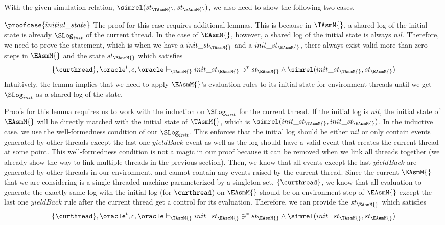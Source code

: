 With the given simulation relation, $\simrel(st_{\TAsmM{}}, st_{\EAsmM{}})$, we also need to show the following two cases.

$\proofcase{initial\_state}$ 
The proof for this case requires additional lemmas.
This is because in $\TAsmM{}$, a shared log of the initial state is already $\SLog_{init}$ of the current thread.
In the case of $\EAsmM{}$, however, a shared log of the initial state is always $nil$. 
Therefore, we need to prove the statement, which is when we have a $init\_st_\TAsmM{}$ and a $init\_st_\EAsmM{}$, there always exist valid more than zero steps in $\EAsmM{}$ and the state $st_{\EAsmM{}}$ which satisfies
$$ \{\curthread\}, \oracle^{t}, c, \oracle\vdash_{\TAsmM{}} init\_st_{\EAsmM{}} \ni^{*} st_{\EAsmM{}} \wedge \simrel(init\_st_{\TAsmM{}}, st_{\EAsmM{}})$$
Intuitively, the lemma implies that we need to apply $\EAsmM{}$'s evaluation rules to its initial state for environment threads until we get $\SLog_{init}$ as a shared log of the state.

Proofs for this lemma requires us to work with the induction on $\SLog_{init}$ for the current thread.
If the initial log is $nil$, the initial state of $\EAsmM{}$ will be directly matched with the initial state of $\TAsmM{}$, which is $\simrel(init\_st_{\TAsmM{}}, init\_st_{\EAsmM{}})$.
In the inductive case, we use the well-formedness condition of our $\SLog_{init}$. 
This enforces that the initial log should be 
either $nil$ or only contain events generated by other threads except the last one $yieldBack$ event as well as 
the log should have a valid event that creates the current thread at some point.
This well-formedness condition is not a magic in our proof because it can be removed when we link all threads together 
(we already show the way to link multiple threads in the previous section).
Then, we know that all events except the last $yieldBack$ are
 generated by other threads in our environment, and cannot contain
any events raised by the current thread. 
Since the current $\EAsmM{}$ that we are considering is a single threaded machine parameterized by
a singleton set, $\{\curthread\}$, we know that all evaluation to generate the exactly same log with the initial log (for $\curthread$) on $\EAsmM{}$ should be on environment step of $\EAsmM{}$ except the last one $yieldBack$ rule after the current 
thread get a control for its evaluation. 
Therefore, we can provide the $st_{\EAsmM{}}$ which satisfies
$$\{\curthread\}, \oracle^{t}, c, \oracle \vdash_{\TAsmM{}} init\_st_{\EAsmM{}} \ni^{*} st_{\EAsmM{}} \wedge \simrel(init\_st_{\TAsmM{}}, st_{\EAsmM{}})$$


